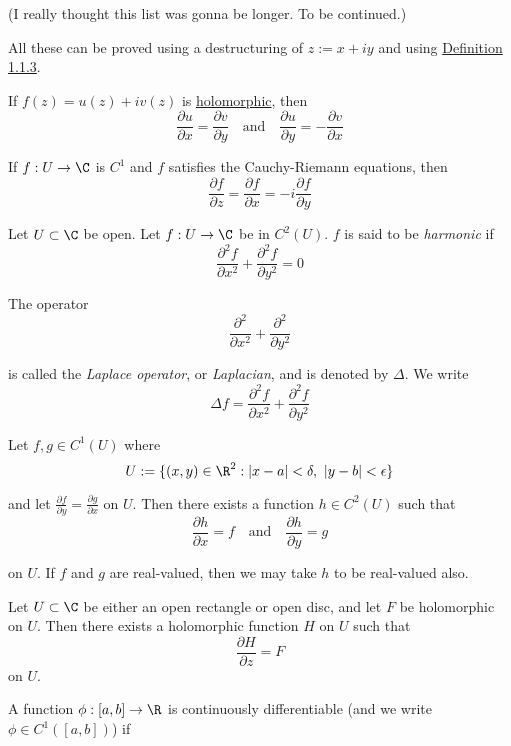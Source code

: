 (I really thought this list was gonna be longer. To be continued.)

All these can be proved using a destructuring of $z:=x+iy$ and using
\href{ffea0ed}{Definition 1.1.3}.

\label{fb10fd3}

If $f(z) = u(z) + iv(z)$ is \href{e1e08f7}{holomorphic}, then
$$
  \frac{\partial u}{\partial x}=\frac{\partial v}{\partial y}
  \quad\text{and}\quad
  \frac{\partial u}{\partial y}=-\frac{\partial v}{\partial x}
$$

\label{d507f47}

If $f:U\to\C$ is $C^1$ and $f$ satisfies the Cauchy-Riemann equations, then
$$
  \frac{\partial f}{\partial z}=\frac{\partial f}{\partial x}=
  -i\frac{\partial f}{\partial y}
$$

\label{d53f60f}

Let $U\subset\C$ be open. Let $f:U\to\C$ be in $C^2(U)$. $f$ is said to be
\textit{harmonic} if
$$
  \frac{\partial^2f}{\partial x^2}+\frac{\partial^2f}{\partial y^2}=0
$$

The operator
$$
  \frac{\partial^2}{\partial x^2}+\frac{\partial^2}{\partial y^2}
$$

is called the \textit{Laplace operator}, or \textit{Laplacian}, and is denoted
by $\Delta$. We write
$$
  \Delta f=\frac{\partial^2f}{\partial x^2}+\frac{\partial^2f}{\partial y^2}
$$

\label{fdd4521}

Let $f,g\in C^1(U)$ where
$$
  U:=\{ (x,y)\in\R^2:|x-a|<\delta,\ |y-b|<\epsilon \}
$$

and let $\displaystyle\frac{\partial f}{\partial y}=\frac{\partial g}{\partial
  x}$ on $U$. Then there exists a function $h\in C^2(U)$ such that
$$
  \frac{\partial h}{\partial x}=f
  \quad\text{and}\quad
  \frac{\partial h}{\partial y}=g
$$

on $U$. If $f$ and $g$ are real-valued, then we may take $h$ to be real-valued
also.

\label{e7808d1}

Let $U\subset\C$ be either an open rectangle or open disc, and let $F$ be
holomorphic on $U$. Then there exists a holomorphic function $H$ on $U$ such
that
$$
  \frac{\partial H}{\partial z}=F
$$
on $U$.

\label{c1f6d35}

A function $\phi:[a,b]\to\R$ is continuously differentiable (and we write
$\phi\in C^1([a,b])$) if

